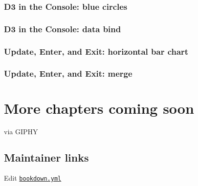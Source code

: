 \documentclass[openany]{book}
\begin{document}
\hypertarget{d3-in-the-console-blue-circles}{%
\subsection*{D3 in the Console: blue circles}\label{d3-in-the-console-blue-circles}}

\hypertarget{d3-in-the-console-data-bind}{%
\subsection*{D3 in the Console: data bind}\label{d3-in-the-console-data-bind}}

\hypertarget{update-enter-and-exit-horizontal-bar-chart}{%
\subsection*{Update, Enter, and Exit: horizontal bar chart}\label{update-enter-and-exit-horizontal-bar-chart}}

\hypertarget{update-enter-and-exit-merge}{%
\subsection*{Update, Enter, and Exit: merge}\label{update-enter-and-exit-merge}}

\hypertarget{more-chapters-coming-soon}{%
\chapter{More chapters coming soon }\label{more-chapters-coming-soon}}

via GIPHY

\hypertarget{maintainer-links}{%
\section{Maintainer links}\label{maintainer-links}}

Edit \href{https://github.com/jtr13/d3book/edit/master/_bookdown.yml}{\texttt{bookdown.yml}}


\end{document}
